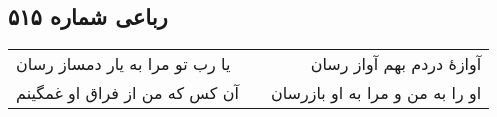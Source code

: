 \begin{center}
\section*{رباعی شماره ۵۱۵}
\label{sec:sh515}
\begin{longtable}{l p{0.5cm} r}
یا رب تو مرا به یار دمساز رسان
&&
آوازهٔ دردم بهم آواز رسان
\\
آن کس که من از فراق او غمگینم
&&
او را به من و مرا به او بازرسان
\\
\end{longtable}
\end{center}
